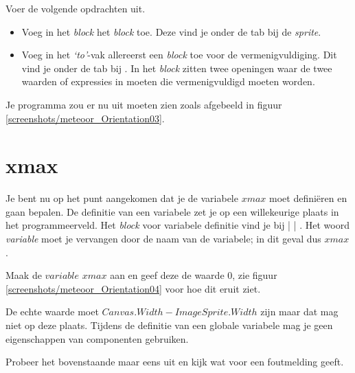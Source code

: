 \begin{opgave}
    \opgVraag
  Voer de volgende opdrachten uit.
  \begin{itemize}
    \item Voeg in het   \emph{block} het  \emph{block} toe. Deze vind je onder de  tab bij de \emph{sprite}.
    \item Voeg in het \emph{`to'}-vak allereerst een \emph{block} toe voor de vermenigvuldiging. Dit vind je onder de  tab bij . In het \block{$\times$} \emph{block} zitten twee openingen waar de twee waarden of expressies in moeten die vermenigvuldigd moeten worden.
  \end{itemize}
\end{opgave}

Je programma zou er nu uit moeten zien zoals afgebeeld in figuur \ref{screenshots/meteoor_Orientation03}.



\section{xmax}
Je bent nu op het punt aangekomen dat je de variabele $xmax$ moet defini\"eren en gaan bepalen. De definitie van een variabele zet je op een willekeurige plaats in het programmeerveld. Het \emph{block} voor variabele definitie vind je bij  |  | . Het woord \emph{variable} moet je vervangen door de naam van de variabele; in dit geval dus $xmax$.

\begin{opgave}
    \opgVraag
  Maak de $variable$ $xmax$ aan en geef deze de waarde $0$, zie figuur \ref{screenshots/meteoor_Orientation04} voor hoe dit eruit ziet.
\end{opgave}

De echte waarde moet $Canvas.Width - ImageSprite.Width$ zijn maar dat mag niet op deze plaats. Tijdens de definitie van een globale variabele mag je geen eigenschappen van componenten gebruiken.

\begin{opgave}
    \opgVraag
  Probeer het bovenstaande maar eens uit en kijk wat \ai voor een foutmelding geeft.
\end{opgave}


